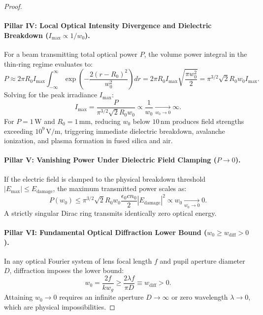 \documentclass[11pt,a4paper]{article}
\begin{document}
\begin{proof}
\paragraph{Pillar IV: Local Optical Intensity Divergence and Dielectric Breakdown ($I_{\max} \propto 1/w_0$).}
For a beam transmitting total optical power $P$, the volume power integral in the thin-ring regime evaluates to:
\begin{equation}
P \approx 2\pi R_0 I_{\max} \int_{-\infty}^\infty \exp\left( - \frac{2(r - R_0)^2}{w_0^2} \right) dr = 2\pi R_0 I_{\max} \sqrt{\frac{\pi w_0^2}{2}} = \pi^{3/2} \sqrt{2} R_0 w_0 I_{\max}.
\label{eq:power_volume_integral}
\end{equation}
Solving for the peak irradiance $I_{\max}$:
\begin{equation}
\boxed{I_{\max} = \frac{P}{\pi^{3/2} \sqrt{2} R_0 w_0} \propto \frac{1}{w_0} \xrightarrow[w_0 \to 0]{} \infty.}
\label{eq:pillar4_result}
\end{equation}
For $P = 1\,\text{W}$ and $R_0 = 1\,\text{mm}$, reducing $w_0$ below $10\,\text{nm}$ produces field strengths exceeding $10^9\,\text{V/m}$, triggering immediate dielectric breakdown, avalanche ionization, and plasma formation in fused silica and air.

\paragraph{Pillar V: Vanishing Power Under Dielectric Field Clamping ($P \to 0$).}
If the electric field is clamped to the physical breakdown threshold $|E_{\max}| \le E_{\text{damage}}$, the maximum transmitted power scales as:
\begin{equation}
\boxed{P(w_0) \le \pi^{3/2} \sqrt{2} R_0 w_0 \frac{\epsilon_0 c n_0}{2} |E_{\text{damage}}|^2 \propto w_0 \xrightarrow[w_0 \to 0]{} 0.}
\label{eq:pillar5_result}
\end{equation}
A strictly singular Dirac ring transmits identically zero optical energy.

\paragraph{Pillar VI: Fundamental Optical Diffraction Lower Bound ($w_0 \ge w_{\text{diff}} > 0$).}
In any optical Fourier system of lens focal length $f$ and pupil aperture diameter $D$, diffraction imposes the lower bound:
\begin{equation}
\boxed{w_0 = \frac{2 f}{k w_g} \ge \frac{2 \lambda f}{\pi D} \equiv w_{\text{diff}} > 0.}
\label{eq:pillar6_result}
\end{equation}
Attaining $w_0 \to 0$ requires an infinite aperture $D \to \infty$ or zero wavelength $\lambda \to 0$, which are physical impossibilities.


\end{proof}
\end{document}
